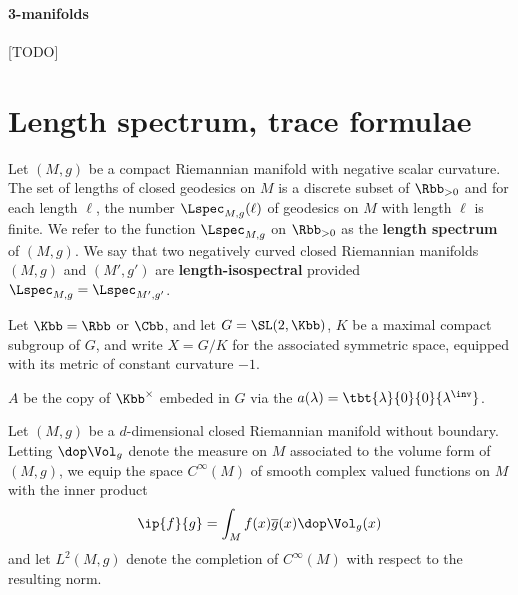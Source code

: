 \paragraph{3-manifolds}
[TODO]
\section{Length spectrum, trace formulae}

Let $(M,g)$ be a compact Riemannian manifold with negative scalar curvature. The set of lengths of closed geodesics on $M$ is a discrete subset of $\Rbb_{>0}$ and for each length $\ell$, the number $\Lspec_{M,g}(\ell)$ of geodesics on $M$ with length $\ell$ is finite. We refer to the function $\Lspec_{M,g}$ on $\Rbb_{>0}$ as the \textbf{length spectrum} of $(M,g)$.  We say that two negatively curved closed Riemannian manifolds $(M,g)$ and $(M',g')$  are \textbf{length-isospectral} provided $\Lspec_{M,g} = \Lspec_{M',g'}$.


Let $\Kbb = \Rbb$ or $\Cbb$, and let $G=\SL(2,\Kbb)$, $K$ be a maximal compact subgroup of $G$, and write $X = G/K$ for the associated symmetric space, equipped with its metric of constant curvature $-1$.

$A$ be the copy of $\Kbb^\times$ embeded in $G$ via the $a(\lambda) = \tbt{\lambda}{0}{0}{\lambda^\inv}$.





\newpage
Let $(M,g)$ be a $d$-dimensional closed Riemannian manifold without boundary.  Letting $\dop \Vol_g$ denote the measure on $M$ associated to the volume form of $(M,g)$, we equip the space $C^\infty(M)$ of smooth complex valued functions on $M$ with the inner product
\begin{align}\label{eq:ip}
  \ip{f}{g} = \int_M f(x) \overline{g}(x) \dop \Vol_g(x)
\end{align}
and let $L^2(M,g)$ denote the completion of $C^\infty(M)$ with respect to the resulting norm.

